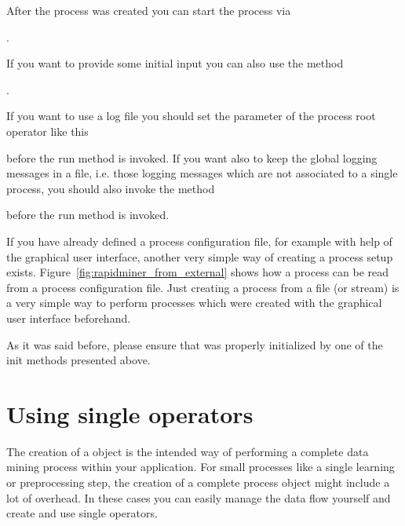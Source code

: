 After the process was created you can start the process via
\begin{center}
. 
\end{center}
If you want to provide some initial input you can also use the method
\begin{center}
.
\end{center}
If you want to use a log file you should set the parameter 
of the process root operator like this 
\begin{center}
\end{center}
before the run method is invoked. If you want also to keep the global 
logging messages in a file, i.e. those logging messages which are not associated 
to a single process, you should also invoke the method
\begin{center}
\end{center}
before the run method is invoked.


If you have already defined a process configuration file, for example
with help of the graphical user interface, another very simple way of
creating a process setup exists. Figure~\ref{fig:rapidminer_from_external} shows how
a process can be read from a process configuration file. 
Just creating a process from a file (or stream) is a very simple way to 
perform processes which were created with the graphical user interface 
beforehand.



As it was said before, please ensure that \rapidminer was properly initialized by one of the 
init methods presented above.



\section{Using single operators}
\label{sec:single_operators}

The creation of a  object is the intended way of performing a complete
data mining process within your application. For small processes like a
single learning or preprocessing step, the creation of a complete process
object might include a lot of overhead. In these cases you can easily manage the
data flow yourself and create and use single operators.

